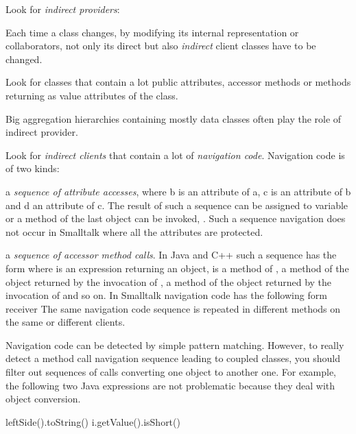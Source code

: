 \documentclass[a4paper,10pt,twoside]{book}
\begin{document}
Look for \emph{indirect providers}:

\begin{bulletlist}
\item Each time a class changes, \eg by modifying its internal representation or collaborators, not only its direct but also \emph{indirect} client classes have to be changed.

\item Look for classes that contain a lot public attributes, accessor methods or methods returning as value attributes of the class.

\item Big aggregation hierarchies containing mostly data classes often play the role of indirect provider.
\end{bulletlist}

Look for \emph{indirect clients} that contain a lot of \emph{navigation code}. Navigation code is of two kinds:

\begin{bulletlist}
\item a \emph{sequence of attribute accesses}, \eg {} where b is an attribute of a, c is an attribute of b and d an attribute of c. The result of such a sequence can be assigned to variable or a method of the last object can be invoked, \eg {}. Such a sequence navigation does not occur in Smalltalk where all the attributes are protected. 

\item a \emph{sequence of accessor method calls}. In Java and C++ such a sequence has the form  where  is an expression returning an object,  is a method of ,  a method of the object returned by the invocation of ,  a method of the object returned by the invocation of  and so on. In Smalltalk navigation code has the following form receiver  The same navigation code sequence is repeated in different methods on the same or different clients. 
\end{bulletlist}

Navigation code can be detected by simple pattern matching. However, to really detect a method call navigation sequence leading to coupled classes, you should filter out sequences of calls converting one object to another one. For example, the following two Java expressions are not problematic because they deal with object conversion.

\begin{code}
leftSide().toString()
i.getValue().isShort()
\end{code}
\end{document}

